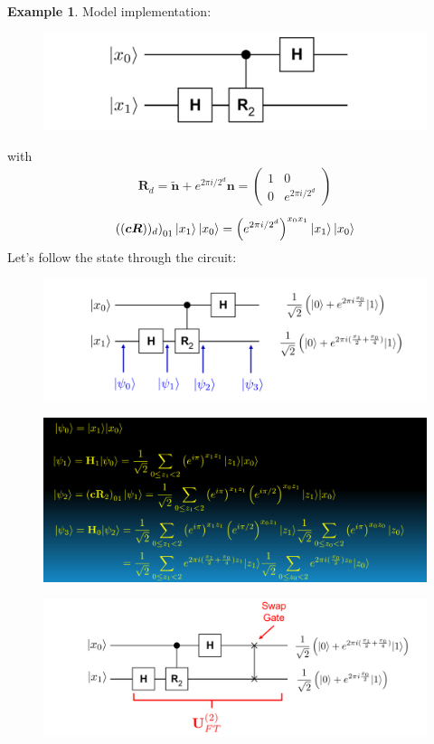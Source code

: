 \documentclass{book}
\theoremstyle{definition}
\newtheorem{exmp}{Example}[section]
\newcommand{\lp}{\left(}
\newcommand{\rp}{\right)}
\begin{document}
\begin{exmp}
	Model implementation:
	\begin{figure}[!htb]
		\centering
		\includegraphics[scale=0.5]{qft1}
	\end{figure}
	with
	\begin{align}
	\bm{R}_d = \bm{\tilde{n}} + e^{2\pi i /2^d}\bm{n} = \begin{pmatrix}
	1 & 0 \\ 0 & e^{2\pi i /2^d}
	\end{pmatrix}
	\end{align}
	\begin{align}
	\lp (\bm{cR}))_d \rp_{01}\ket{x_1}\ket{x_0} = \lp e^{2\pi i/2^d} \rp^{x_0 x_1}\ket{x_1}\ket{x_0}
	\end{align}
	Let's follow the state through the circuit:
	\begin{figure}[!htb]
		\centering
		\includegraphics[scale=0.5]{qft2}
	\end{figure}
	\begin{figure}[!htb]
		\centering
		\includegraphics[scale=0.5]{qft3}
	\end{figure}
	\begin{figure}[!htb]
		\centering
		\includegraphics[scale=0.5]{qft4}

\end{figure}
\end{exmp}
\end{document}
